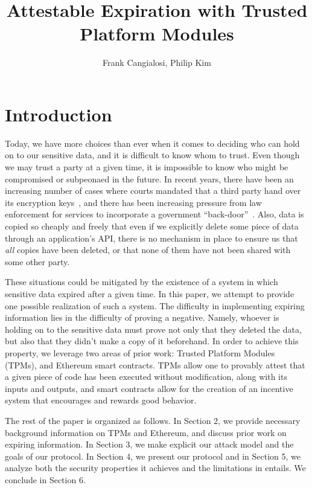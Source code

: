 \documentclass{article}
\begin{document}
\title{Attestable Expiration with Trusted Platform Modules}
\author{Frank Cangialosi, Philip Kim}

\maketitle

\section{Introduction}

Today, we have more choices than ever when it comes to deciding who can hold on to our sensitive data, and it is difficult to know whom to trust. Even though we may trust a party at a given time, it is impossible to know who might be compromised or subpeonaed in the future. In recent years, there have been an increasing number of cases where courts mandated that a third party hand over its encryption keys~\cite{hushmail}, and there has been increasing pressure from law enforcement for services to incorporate a government ``back-door''~\cite{backdoor}. Also, data is copied so cheaply and freely that even if we explicitly delete some piece of data through an application's API, there is no mechanism in place to ensure us that \textit{all} copies have been deleted, or that none of them have not been shared with some other party.

These situations could be mitigated by the existence of a system in which sensitive data expired after a given time. In this paper, we attempt to provide one possible realization of such a system. The difficulty in implementing expiring information lies in the difficulty of proving a negative. Namely, whoever is holding on to the sensitive data must prove not only that they deleted the data, but also that they didn't make a copy of it beforehand. In order to achieve this property, we leverage two areas of prior work: Trusted Platform Modules (TPMs), and Ethereum smart contracts. TPMs allow one to provably attest that a given piece of code has been executed without modification, along with its inputs and outputs, and smart contracts allow for the creation of an incentive system that encourages and rewards good behavior.

The rest of the paper is organized as follows. In Section 2, we provide necessary background information on TPMs and Ethereum, and discuss prior work on expiring information. In Section 3, we make explicit our attack model and the goals of our protocol. In Section 4, we present our protocol and in Section 5, we analyze both the security properties it achieves and the limitations in entails. We conclude in Section 6.
\end{document}
